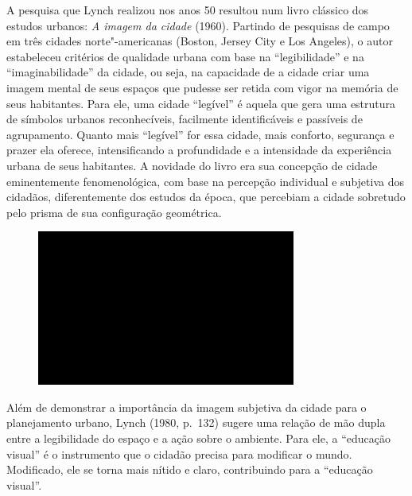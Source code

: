 A pesquisa que Lynch realizou nos anos 50 resultou num livro clássico
dos estudos urbanos: \emph{A imagem da cidade} (1960). Partindo de
pesquisas de campo em três cidades norte"-americanas (Boston, Jersey City
e Los Angeles), o autor estabeleceu critérios de qualidade urbana com
base na ``legibilidade'' e na ``imaginabilidade'' da cidade, ou seja, na
capacidade de a cidade criar uma imagem mental de seus espaços que
pudesse ser retida com vigor na memória de seus habitantes. Para ele,
uma cidade ``legível'' é aquela que gera uma estrutura de símbolos
urbanos reconhecíveis, facilmente identificáveis e passíveis de
agrupamento. Quanto mais ``legível'' for essa cidade, mais conforto,
segurança e prazer ela oferece, intensificando a profundidade e a
intensidade da experiência urbana de seus habitantes. A novidade do
livro era sua concepção de cidade eminentemente fenomenológica, com base
na percepção individual e subjetiva dos cidadãos, diferentemente dos
estudos da época, que percebiam a cidade sobretudo pelo prisma de sua
configuração geométrica.

\begin{figure}[!ht]

\centering
 \includegraphics[width=85mm]{./imgs/im1.jpg}
\caption{\tiny{}}

\end{figure}

Além de demonstrar a importância da imagem subjetiva da cidade para o
planejamento urbano, Lynch (1980, p.~132) sugere uma relação de mão
dupla entre a legibilidade do espaço e a ação sobre o ambiente. Para
ele, a ``educação visual'' é o instrumento que o cidadão precisa para
modificar o mundo. Modificado, ele se torna mais nítido e claro,
contribuindo para a ``educação visual''.

